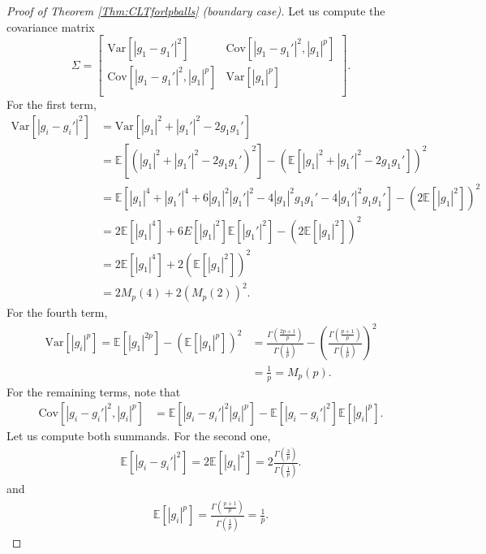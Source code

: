 \documentclass[10pt]{amsart}
\def\E{\mathbb{E}}
\def\var{\text{Var}}
\def\cov{\text{Cov}}
\numberwithin{equation}{section}
\begin{document}
\begin{proof}[Proof of Theorem \ref{Thm:CLTforlpballs} (boundary case)]
Let us compute the covariance matrix 
\[
   \Sigma = 
  \left[ {\begin{array}{cc}
   \var[|g_1 - g_1'|^2] & \cov[|g_1 - g_1'|^2 , |g_1|^p] \\
   \cov[|g_1 - g_1'|^2 , |g_1|^p] &  \var[|g_1|^p] \\
  \end{array} } \right].
\]
For the first term,
\begin{align*}
\var \left[ \left| g_i - g_i' \right|^2   \right] & = \var \left[ | g_1 |^2 + | g_1' |^2
- 2 g_1 g_1'   \right]
 \\
 & = \E \left[ \left( | g_1 |^2 + | g_1' |^2 - 2 g_1 g_1' \right) ^2 \right] -
\left( \E \left[ | g_1 |^2 + | g_1' |^2 - 2 g_1 g_1'   \right] \right)^2
 \\
 & = \E \left[ |g_1|^4 + |g_1'|^4 + 6 |g_1|^2 |g_1'|^2 -4|g_1|^2 g_1g_1' -4|g_1'|^2 g_1g_1'   \right]
 - \left( 2 \E \left[ |g_1|^2  \right] \right)^2
 \\
 & = 2 \E \left[ |g_1|^4 \right] + 6 E\left[ |g_1|^2 \right] \E \left[ |g_1'|^2 \right] - \left( 2 \E \left[ |g_1|^2  \right] \right)^2
 \\
 & = 2 \E \left[ |g_1|^4 \right] + 2 \left( \E \left[ |g_1|^2  \right] \right)^2
 \\
 & = 2 M_p(4) + 2 (M_p(2))^2.
\end{align*}
For the fourth term,
\begin{align*}
\var \left[ \left| g_i\right|^p   \right] = \E \left[  | g_1 |^{2p} \right] -
\left( \E \left[ | g_1 |^p   \right] \right)^2 & = \frac{\Gamma \left( \frac{2p + 1}{p} \right)}{\Gamma \left( \frac{1}{p} \right)} - \left( \frac{\Gamma \left( \frac{p+1}{p} \right)}{\Gamma \left( \frac{1}{p} \right)} \right)^2 
 \\
  & = \frac{1}{p} = M_p(p).
\end{align*}
For the remaining terms, note that
\begin{align*}
\cov[\left| g_i - g_i'\right|^2 , \left| g_i\right|^p ] & = \E [\left| g_i - g_i'\right|^2 \left| g_i\right|^p  ] - \E [\left| g_i - g_i'\right|^2  ] \E [ \left| g_i\right|^p  ].
\end{align*}
Let us compute both summands. For the second one,
\begin{align*}
\E [\left| g_i - g_i'\right|^2] = 2\E [\left| g_1 \right|^2] = 2 \frac{\Gamma \left( \frac{3}{p} \right)}{\Gamma \left( \frac{1}{p} \right)}.
\end{align*}
and
\begin{align*}
\E [\left| g_i \right|^p] = \frac{\Gamma \left( \frac{p+1}{p} \right)}{\Gamma \left( \frac{1}{p} \right)} = \frac{1}{p}.

\end{align*}
\end{proof}
\end{document}
